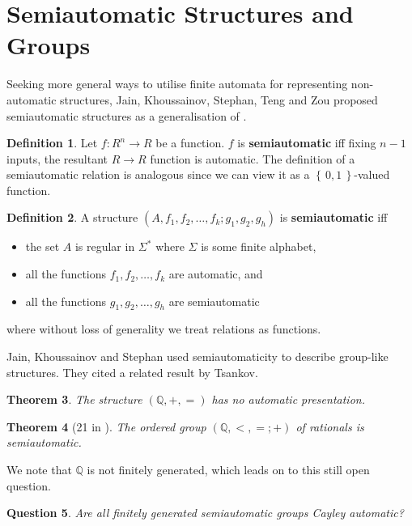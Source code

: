 \documentclass[british,a4paper,]{scrartcl}
\newtheorem{theorem}{Theorem}
\newtheorem{question}[theorem]{Question}
\theoremstyle{definition}
\newtheorem{definition}[theorem]{Definition}
\theoremstyle{remark}
\newcommand{\set}[1]{\left\{\, #1 \,\right\}}
\newcommand{\Q}{\mathbb{Q}}
\begin{document}
\section{Semiautomatic Structures and Groups}

Seeking more general ways to utilise finite automata for representing non-automatic structures,
Jain, Khoussainov, Stephan, Teng and Zou
proposed semiautomatic structures as a generalisation of \autocite{semiauto}.
\begin{definition}
    Let \(f: R^n \to R\) be a function.
    \(f\) is \textbf{semiautomatic} iff fixing \(n-1\) inputs, the resultant \(R\to R\) function is automatic.
    The definition of a semiautomatic relation is analogous since we can view it as a \(\set{0,1}\)-valued function.
\end{definition}

\begin{definition}
    A structure \((A, f_1, f_2, \dots, f_k; g_1, g_2, g_h)\) is \textbf{semiautomatic} iff
    \begin{itemize}
        \item the set \(A\) is regular in \(\Sigma^*\) where \(\Sigma\) is some finite alphabet,
        \item all the functions \(f_1, f_2, \dots, f_k\) are automatic, and
        \item all the functions \(g_1, g_2, \dots, g_h\) are semiautomatic
    \end{itemize}
    where without loss of generality we treat relations as functions.
\end{definition}

Jain, Khoussainov and Stephan used semiautomaticity to describe group-like structures.\autocite{finitelysanjay}
They cited a related result by Tsankov.\autocite{tsankov}
\begin{theorem}
    The structure \((\Q, +, =)\) has no automatic presentation.
\end{theorem}
\begin{theorem}[21 in \autocite{semiauto}]
    The ordered group \((\Q,<,=;+)\) of rationals is semiautomatic.
\end{theorem}

We note that \(\Q\) is not finitely generated, which leads on to this still open question.
\begin{question}
    Are all finitely generated semiautomatic groups Cayley automatic?
\end{question}
\end{document}
